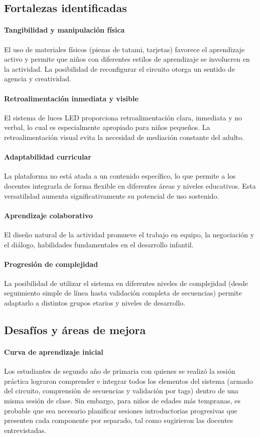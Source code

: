 \documentclass{prgrado}
\begin{document}
\subsection{Fortalezas identificadas}
\paragraph{Tangibilidad y manipulación física} El uso de materiales físicos (piezas de tatami, tarjetas) favorece el aprendizaje activo y permite que niños con diferentes estilos de aprendizaje se involucren en la actividad. La posibilidad de reconfigurar el circuito otorga un sentido de agencia y creatividad.
\paragraph{Retroalimentación inmediata y visible} El sistema de luces LED proporciona retroalimentación clara, inmediata y no verbal, lo cual es especialmente apropiado para niños pequeños. La retroalimentación visual evita la necesidad de mediación constante del adulto.
\paragraph{Adaptabilidad curricular} La plataforma no está atada a un contenido específico, lo que permite a los docentes integrarla de forma flexible en diferentes áreas y niveles educativos. Esta versatilidad aumenta significativamente su potencial de uso sostenido.
\paragraph{Aprendizaje colaborativo} El diseño natural de la actividad promueve el trabajo en equipo, la negociación y el diálogo, habilidades fundamentales en el desarrollo infantil.
\paragraph{Progresión de complejidad} La posibilidad de utilizar el sistema en diferentes niveles de complejidad (desde seguimiento simple de línea hasta validación completa de secuencias) permite adaptarlo a distintos grupos etarios y niveles de desarrollo.

\subsection{Desafíos y áreas de mejora}
\paragraph{Curva de aprendizaje inicial} Los estudiantes de segundo año de primaria con quienes se realizó la sesión práctica lograron comprender e integrar todos los elementos del sistema (armado del circuito, comprensión de secuencias y validación por tags) dentro de una misma sesión de clase. Sin embargo, para niños de edades más tempranas, es probable que sea necesario planificar sesiones introductorias progresivas que presenten cada componente por separado, tal como sugirieron las docentes entrevistadas.
\end{document}
